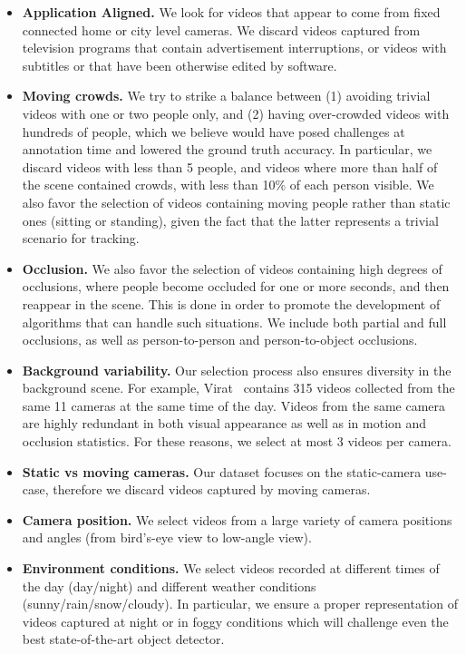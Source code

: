 \documentclass[runningheads]{llncs}
\begin{document}
\begin{itemize}

\item \textbf{Application Aligned.} We look for videos that appear to come from fixed connected home or city level cameras. We discard videos captured from television programs that contain advertisement interruptions, or videos with subtitles or that have been otherwise edited by software.


\item \textbf{Moving crowds.} We try to strike a balance between (1) avoiding trivial videos with one or two people only, and (2) having over-crowded videos with hundreds of people, which we believe would have posed challenges at annotation time and lowered the ground truth accuracy. In particular, we discard videos with less than 5 people, and videos where more than half of the scene contained crowds, with less than 10\% of each person visible. We also favor the selection of videos containing moving people rather than static ones (sitting or standing), given the fact that the latter represents a trivial scenario for tracking.

\item \textbf{Occlusion.} We also favor the selection of videos containing high degrees of occlusions, where people become occluded for one or more seconds, and then reappear in the scene. This is done in order to promote the development of algorithms that can handle such situations. We include both partial and full occlusions, as well as person-to-person and person-to-object occlusions.

\item \textbf{Background variability.} Our selection process also ensures diversity in the background scene. For example, Virat~\cite{virat} contains 315 videos collected from the same 11 cameras at the same time of the day.
Videos from the same camera are highly redundant in both visual appearance as well as in motion and occlusion statistics. For these reasons, we select at most 3 videos per camera.


\item \textbf{Static vs moving cameras.} Our dataset focuses on the static-camera use-case, therefore we discard videos captured by moving cameras.

\item \textbf{Camera position.} We select videos from a large variety of camera positions and angles (from bird's-eye view to low-angle view).

\item \textbf{Environment conditions.} We select videos recorded at different times of the day (day/night) and different weather conditions (sunny/rain/snow/cloudy). In particular, we ensure a proper representation of videos captured at night or in foggy conditions which will challenge even the best state-of-the-art object detector.
\end{itemize}
\end{document}
